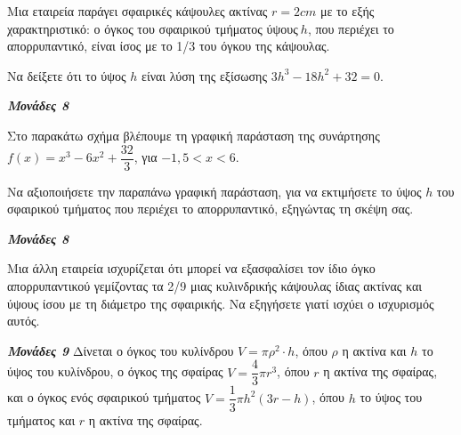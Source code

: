 \documentclass[11pt,a4paper,twoside]{book}
\newcommand{\monades}[1]{
\hspace*{\fill}
\textbf{\textit{\textcolor{maincolor}{Μονάδες #1}}}}
\begin{document}
\begin{alist}
\item Μια εταιρεία παράγει σφαιρικές κάψουλες ακτίνας $r = 2cm$ με το εξής χαρακτηριστικό: ο όγκος του σφαιρικού τμήματος ύψους$\ h$, που περιέχει το απορρυπαντικό, είναι ίσος με το 1/3 του όγκου της κάψουλας.

\begin{rlist}
\item Να δείξετε ότι το ύψος $h$ είναι λύση της εξίσωσης ${3h}^{3} - 18h^{2} + 32 = 0$.
\monades{8}
\item Στο παρακάτω σχήμα βλέπουμε τη γραφική παράσταση της συνάρτησης $f(x) = x^{3} - 6x^{2} + \dfrac{32}{3}$, για $- 1{,}5 < x < 6$.

\begin{center}

\end{center}

Να αξιοποιήσετε την παραπάνω γραφική παράσταση, για να εκτιμήσετε το ύψος $h$ του σφαιρικού τμήματος που περιέχει το απορρυπαντικό, εξηγώντας τη σκέψη σας.
\monades{8}
\end{rlist}
\item Μια άλλη εταιρεία ισχυρίζεται ότι μπορεί να εξασφαλίσει τον ίδιο όγκο απορρυπαντικού γεμίζοντας τα 2/9 μιας κυλινδρικής κάψουλας ίδιας ακτίνας και ύψους ίσου με τη διάμετρο της σφαιρικής. Να εξηγήσετε γιατί ισχύει ο ισχυρισμός αυτός.
\monades{9}
Δίνεται ο όγκος του κυλίνδρου $V = \pi\rho^{2} \cdot h$, όπου $\rho$ η ακτίνα και $h$ το ύψος του κυλίνδρου, ο όγκος της σφαίρας $V = \dfrac{4}{3}\pi r^{3}$, όπου $r$ η ακτίνα της σφαίρας, και ο όγκος ενός σφαιρικού τμήματος $V = \dfrac{1}{3}\pi h^{2}(3r - h)$, όπου $h$ το ύψος του τμήματος και $r$ η ακτίνα της σφαίρας.


\end{alist}
\end{document}
